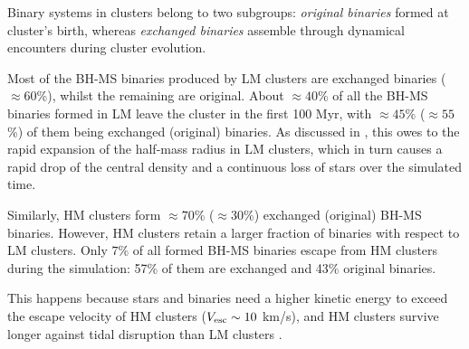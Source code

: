 \documentclass[fleqn,usenatbib]{mnras}
\begin{document}
 Binary systems in clusters belong to two subgroups: \textit{original binaries} formed at cluster's birth, whereas \textit{exchanged binaries} assemble through dynamical encounters during cluster evolution.

Most of the BH-MS binaries produced by LM clusters are exchanged binaries ($\approx60$\%), whilst the remaining are original. 
About $\approx40$\% of all the BH-MS binaries formed in LM leave the cluster in the first 100 Myr, with $\approx45$\% ($\approx55$\%) of them being exchanged (original) binaries. As discussed in \citet[][section 3.1 and figure 1]{rastello2021}, this owes 
to the rapid expansion of the half-mass radius in LM clusters, which in turn causes a rapid drop of the central density and a continuous loss of stars over the simulated time.

Similarly, HM clusters form $\approx70$\% ($\approx 30$\%) exchanged (original) BH-MS binaries. However, HM clusters retain a larger fraction of binaries with respect to LM clusters. Only $7$\% of all formed BH-MS binaries escape from HM clusters during the simulation: 57\% of them are exchanged and 43\% original binaries. 

This happens because stars and binaries need a higher kinetic energy to exceed the escape velocity of HM clusters ($V_{\rm{esc}}\sim 10$ km/s), and HM clusters  survive longer against tidal disruption than LM clusters \citep[see e.g.,][]{torniamenti2022}. 
\end{document}
